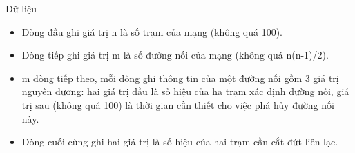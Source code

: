 Dữ liệu
\begin{itemize}
	\item     Dòng đầu ghi giá trị n là số trạm của mạng (không quá 100).   
	\item     Dòng tiếp ghi giá trị m là số đường nối của mạng (không quá n(n-1)/2).   
	\item     m dòng tiếp theo, mỗi dòng ghi thông tin của một đường nối gồm 3 giá trị nguyên dương: hai giá trị đầu là số hiệu của ha trạm xác định đường nối,   giá trị sau (không quá 100) là thời gian cần thiết cho việc phá hủy đường nối này.   
	\item     Dòng cuối cùng ghi hai giá trị là số hiệu của hai trạm cần cắt đứt liên lạc.   
\end{itemize}